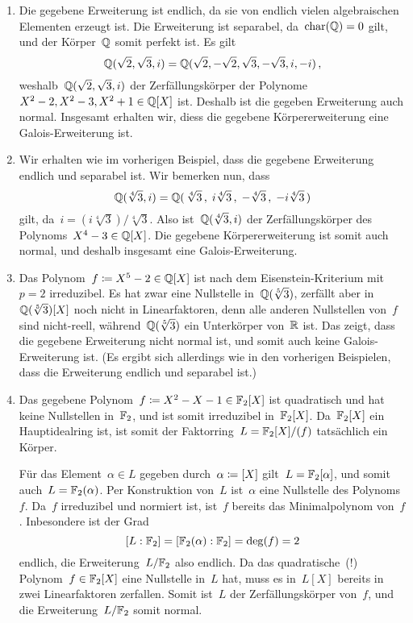 \documentclass{scrartcl}
\begin{document}
\begin{solution}
  \begin{enumerate}
    \item
      Die gegebene Erweiterung ist endlich, da sie von endlich vielen algebraischen Elementen erzeugt ist.
      Die Erweiterung ist separabel, da~$\operatorname{char}(\mathbb{Q}) = 0$ gilt, und der Körper~$\mathbb{Q}$ somit perfekt ist.
      Es gilt
      \[
        \mathbb{Q}( \sqrt{2}, \sqrt{3}, i )
        =
        \mathbb{Q}( \sqrt{2}, -\sqrt{2}, \sqrt{3}, -\sqrt{3}, i, -i ) \,,
      \]
      weshalb~$\mathbb{Q}( \sqrt{2}, \sqrt{3}, i )$ der Zerfällungskörper der Polynome~$X^2 - 2, X^2 - 3, X^2 + 1 \in \mathbb{Q}[X]$ ist.
      Deshalb ist die gegeben Erweiterung auch normal.
      Insgesamt erhalten wir, diess die gegebene Körpererweiterung eine Galois-Erweiterung ist.
    \item
      Wir erhalten wie im vorherigen Beispiel, dass die gegebene Erweiterung endlich und separabel ist.
      Wir bemerken nun, dass
      \[
        \mathbb{Q}( \sqrt[4]{3}, i )
        =
        \mathbb{Q}( \, \sqrt[4]{3} \,, \; i \sqrt[4]{3} \,, \; -\sqrt[4]{3} \,, \; -i \sqrt[4]{3} \, )
      \]
      gilt, da~$i = ( i \sqrt[4]{3} ) / \sqrt[4]{3}$.
      Also ist~$\mathbb{Q}( \sqrt[4]{3}, i )$ der Zerfällungskörper des Polynoms~$X^4 - 3 \in \mathbb{Q}[X]$.
      Die gegebene Körpererweiterung ist somit auch normal, und deshalb insgesamt eine Galois-Erweiterung.
    \item
      Das Polynom~$f \coloneqq X^5 - 2 \in \mathbb{Q}[X]$ ist nach dem Eisenstein-Kriterium mit~$p = 2$ irreduzibel.
      Es hat zwar eine Nullstelle in~$\mathbb{Q}( \sqrt[5]{3})$, zerfällt aber in~$\mathbb{Q}( \sqrt[5]{3})[X]$ noch nicht in Linearfaktoren, denn alle anderen Nullstellen von~$f$ sind nicht-reell, während~$\mathbb{Q}( \sqrt[5]{3})$ ein Unterkörper von~$\mathbb{R}$ ist.
      Das zeigt, dass die gegebene Erweiterung nicht normal ist, und somit auch keine Galois-Erweiterung ist.
      (Es ergibt sich allerdings wie in den vorherigen Beispielen, dass die Erweiterung endlich und separabel ist.)
    \item
      Das gegebene Polynom~$f \coloneqq X^2 - X - 1 \in \mathbb{F}_2[X]$ ist quadratisch und hat keine Nullstellen in~$\mathbb{F}_2$, und ist somit irreduzibel in~$\mathbb{F}_2[X]$.
      Da~$\mathbb{F}_2[X]$ ein Hauptidealring ist, ist somit der Faktorring~$L = \mathbb{F}_2[X] / (f)$ tatsächlich ein Körper.

      Für das Element~$\alpha \in L$ gegeben durch~$\alpha \coloneqq [X]$ gilt~$L = \mathbb{F}_2[\alpha]$, und somit auch~$L = \mathbb{F}_2(\alpha)$.
      Per Konstruktion von~$L$ ist~$\alpha$ eine Nullstelle des Polynoms~$f$.
      Da~$f$ irreduzibel und normiert ist, ist~$f$ bereits das Minimalpolynom von~$f$.
      Inbesondere ist der Grad
      \[
        [L : \mathbb{F}_2]
        =
        [\mathbb{F}_2(\alpha) : \mathbb{F}_2]
        =
        \deg(f)
        =
        2
      \]
      endlich, die Erweiterung~$L/\mathbb{F}_2$ also endlich.
      Da das quadratische~(!) Polynom~$f \in \mathbb{F}_2[X]$ eine Nullstelle in~$L$ hat, muss es in~$L[X]$ bereits in zwei Linearfaktoren zerfallen.
      Somit ist~$L$ der Zerfällungskörper von~$f$, und die Erweiterung~$L/\mathbb{F}_2$ somit normal.


\end{enumerate}
\end{solution}
\end{document}
